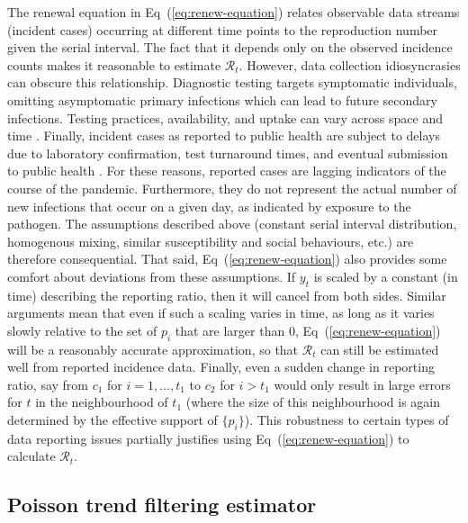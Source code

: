 \documentclass[10pt,letterpaper]{article}
\def\calR{\mathcal{R}}
\newcommand{\citep}[1]{\cite{#1}}
\renewcommand{\eqref}[1]{Eq~(\ref{#1})}
\begin{document}
The renewal equation in \eqref{eq:renew-equation} relates observable data
streams (incident cases) occurring at different time points to the reproduction
number given the serial interval. The fact that it depends only on the observed
incidence counts makes it reasonable to estimate $\calR_t$. However, 
data collection idiosyncrasies can obscure this relationship. Diagnostic testing
targets symptomatic individuals, omitting asymptomatic primary infections which
can lead to future secondary infections. Testing practices, availability, and
uptake can vary across space and time \citep{pitzer2021impact,
hitchings2021usefulness}. Finally, incident cases as reported to public health
are subject to delays due to laboratory confirmation, test turnaround times, and
eventual submission to public health \citep{pellis2021challenges}. For these
reasons, reported cases are lagging indicators of the course of the pandemic.
Furthermore, they do not represent the actual number of new infections that
occur on a given day, as indicated by exposure to the pathogen. The assumptions
described above (constant serial interval distribution, homogenous mixing,
similar susceptibility and social behaviours, etc.) are therefore consequential.
That said, \eqref{eq:renew-equation} also provides some comfort about deviations
from these assumptions. If $y_t$ is scaled by a constant (in time) describing
the reporting ratio, then it will cancel from both sides. Similar arguments mean
that even if such a scaling varies in time, as long as it varies slowly relative
to the set of $p_i$ that are larger than 0, \eqref{eq:renew-equation} will be a
reasonably accurate approximation, so that $\calR_t$ can still be estimated well
from reported incidence data. Finally, even a sudden change in reporting ratio, 
say from $c_1$ for $i=1,\ldots,t_1$ to $c_2$ for $i>t_1$ would only result in 
large errors for $t$ in the neighbourhood of $t_1$ (where the size of this 
neighbourhood is again determined by the effective support of $\{p_i\}$). 
This robustness to certain types of data reporting issues partially justifies 
using \eqref{eq:renew-equation} to calculate $\calR_t$.


\subsection{Poisson trend filtering estimator} 
\end{document}

